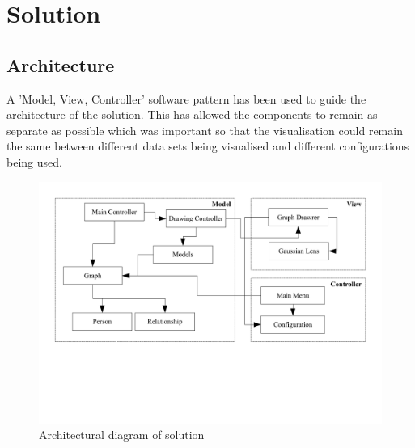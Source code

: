 \documentclass[12pt,a4paper]{article}
\begin{document}

\section{Solution}

\subsection{Architecture}
\noindent
A 'Model, View, Controller' software pattern has been used to guide the architecture of the solution. This has allowed the components to remain as separate as possible which was important so that the visualisation could remain the same between different data sets being visualised and different configurations being used.

\begin{figure}[htb]
\centering
\caption{Architectural diagram of solution}
\label{fig:diagram}
\includegraphics[scale=0.75]{ArchitectureDiagram.pdf}
\end{figure}
\end{document}
